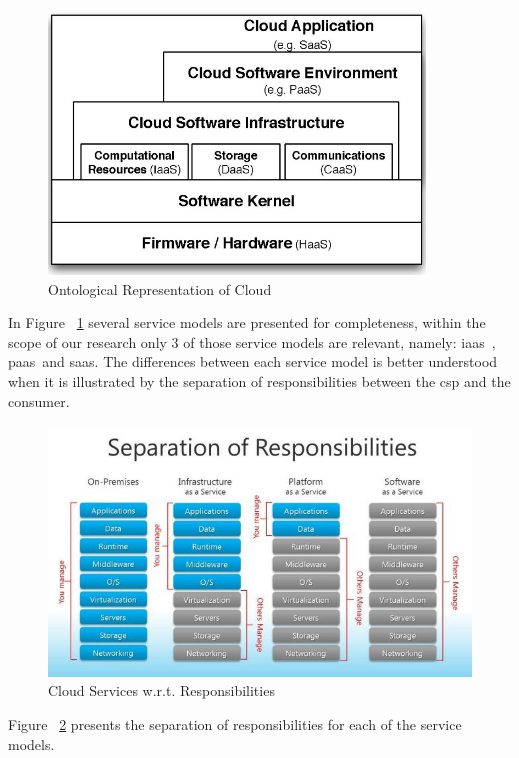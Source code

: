 \documentclass[12pt, titlepage]{uo_temp}
\begin{document}
       \begin{figure}[h]
	 \includegraphics[width=100mm]{images/c_ontology.png}
	 \caption{Ontological Representation of Cloud\label{c_ontology}\cite{ontology}}
       \end{figure}

     In Figure ~\ref{c_ontology} several service models are presented for completeness, within the
     scope of our research only 3 of those service models are relevant, namely: 
     \gls{iaas}\ , \gls{paas}\ and \gls{saas}. The differences between each service model
     is better understood when it is illustrated by the separation of responsibilities
     between the \gls{csp} and the consumer.

       \begin{figure}[h]
	 \includegraphics[width=125mm]{images/cloud_sep_of_resp.jpg}
	 \caption{Cloud Services w.r.t. Responsibilities\label{cloud_sep_of_resp}}
       \end{figure}

     Figure ~\ref{cloud_sep_of_resp} presents the separation of responsibilities for
     each of the service models.
\end{document}

